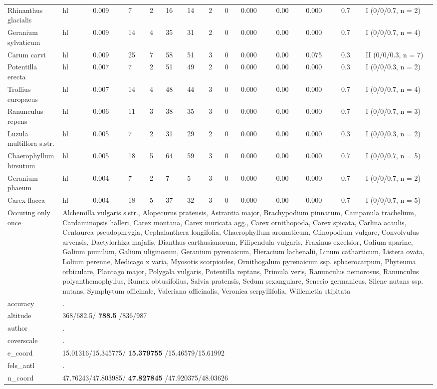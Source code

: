 \documentclass[9pt]{article}
\begin{document}
\begin{longtable}{lllllllllllllll}
Rhinanthus glacialis&hl&&0.009& 7& 2& 16& 14&2&0&0.000&0.00& 0.000& 0.7&I (0/0/0.7, n = 2)\tabularnewline
Geranium sylvaticum&hl&&0.009&14& 4& 35& 31&2&0&0.000&0.00& 0.000& 0.7&I (0/0/0.7, n = 4)\tabularnewline
Carum carvi&hl&&0.009&25& 7& 58& 51&3&0&0.000&0.00& 0.075& 0.3&II (0/0/0.3, n = 7)\tabularnewline
Potentilla erecta&hl&&0.007& 7& 2& 51& 49&2&0&0.000&0.00& 0.000& 0.3&I (0/0/0.3, n = 2)\tabularnewline
Trollius europaeus&hl&&0.007&14& 4& 48& 44&3&0&0.000&0.00& 0.000& 0.7&I (0/0/0.7, n = 4)\tabularnewline
Ranunculus repens&hl&&0.006&11& 3& 38& 35&3&0&0.000&0.00& 0.000& 0.7&I (0/0/0.7, n = 3)\tabularnewline
Luzula multiflora s.str.&hl&&0.005& 7& 2& 31& 29&2&0&0.000&0.00& 0.000& 0.3&I (0/0/0.3, n = 2)\tabularnewline
Chaerophyllum hirsutum&hl&&0.005&18& 5& 64& 59&3&0&0.000&0.00& 0.000& 0.7&I (0/0/0.7, n = 5)\tabularnewline
Geranium phaeum&hl&&0.004& 7& 2&  7&  5&3&0&0.000&0.00& 0.000& 0.7&I (0/0/0.7, n = 2)\tabularnewline
Carex flacca&hl&&0.004&18& 5& 37& 32&3&0&0.000&0.00& 0.000& 0.7&I (0/0/0.7, n = 5)\tabularnewline
\midrule
Occuring only once& \multicolumn{14}{p{150mm}}{Alchemilla vulgaris s.str., Alopecurus pratensis, Astrantia major, Brachypodium pinnatum, Campanula trachelium, Cardaminopsis halleri, Carex montana, Carex muricata agg., Carex ornithopoda, Carex spicata, Carlina acaulis, Centaurea pseudophrygia, Cephalanthera longifolia, Chaerophyllum aromaticum, Clinopodium vulgare, Convolvulus arvensis, Dactylorhiza majalis, Dianthus carthusianorum, Filipendula vulgaris, Fraxinus excelsior, Galium aparine, Galium pumilum, Galium uliginosum, Geranium pyrenaicum, Hieracium lachenalii, Linum catharticum, Listera ovata, Lolium perenne, Medicago x varia, Myosotis scorpioides, Ornithogalum pyrenaicum ssp. sphaerocarpum, Phyteuma orbiculare, Plantago major, Polygala vulgaris, Potentilla reptans, Primula veris, Ranunculus nemorosus, Ranunculus polyanthemophyllus, Rumex obtusifolius, Salvia pratensis, Sedum sexangulare, Senecio germanicus, Silene nutans ssp. nutans, Symphytum officinale, Valeriana officinalis, Veronica serpyllifolia, Willemetia stipitata}\tabularnewline
\midrule
accuracy& \multicolumn{14}{p{150mm}}{.}\tabularnewline
altitude& \multicolumn{14}{p{150mm}}{368/682.5/\textbf{ 788.5 }/836/987}\tabularnewline
author& \multicolumn{14}{p{150mm}}{.}\tabularnewline
coverscale& \multicolumn{14}{p{150mm}}{.}\tabularnewline
e_coord& \multicolumn{14}{p{150mm}}{15.01316/15.345775/\textbf{ 15.379755 }/15.46579/15.61992}\tabularnewline
fels_antl& \multicolumn{14}{p{150mm}}{.}\tabularnewline
n_coord& \multicolumn{14}{p{150mm}}{47.76243/47.803985/\textbf{ 47.827845 }/47.920375/48.03626}\tabularnewline

\end{longtable}
\end{document}
